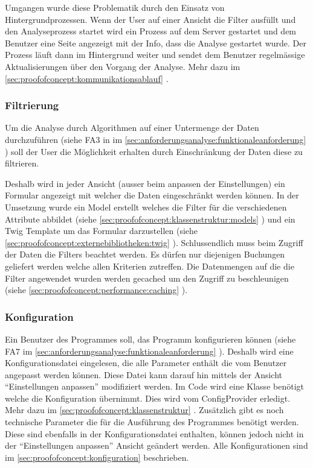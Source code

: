 Umgangen wurde diese Problematik durch den Einsatz von Hintergrundprozessen. Wenn der User auf einer Ansicht die Filter ausfüllt und den Analyseprozess startet wird ein Prozess auf dem Server gestartet und dem Benutzer eine Seite angezeigt mit der Info, dass die Analyse gestartet wurde. Der Prozess läuft dann im Hintergrund weiter und sendet dem Benutzer regelmässige Aktualisierungen über den Vorgang der Analyse. Mehr dazu im \cref{sec:proofofconcept:kommunikationsablauf} .

\subsubsection{Filtrierung}
\label{sec:proofofconcept:architektur:anforderungen:filtrierung}
Um die Analyse durch Algorithmen auf einer Untermenge der Daten durchzuführen (siehe FA3 in im \cref{sec:anforderungsanalyse:funktionaleanforderung} ) soll der User die Möglichkeit erhalten durch Einschränkung der Daten diese zu filtrieren. 

Deshalb wird in jeder Ansicht (ausser beim anpassen der Einstellungen) ein Formular angezeigt mit welcher die Daten eingeschränkt werden können. In der Umsetzung wurde ein Model erstellt welches die Filter für die verschiedenen Attribute abbildet (siehe \cref{sec:proofofconcept:klassenstruktur:models} ) und ein Twig Template um das Formular darzustellen (siehe \cref{sec:proofofconcept:externebibliotheken:twig} ). Schlussendlich muss beim Zugriff der Daten die Filters beachtet werden. Es dürfen nur diejenigen Buchungen geliefert werden welche allen Kriterien zutreffen. Die Datenmengen auf die die Filter angewendet wurden werden gecached um den Zugriff zu beschleunigen (siehe \cref{sec:proofofconcept:performance:caching} ).

\subsubsection{Konfiguration}
Ein Benutzer des Programmes soll, das Programm konfigurieren können (siehe FA7 im \cref{sec:anforderungsanalyse:funktionaleanforderung} ). Deshalb wird eine Konfigurationsdatei eingelesen, die alle Parameter enthält die vom Benutzer angepasst werden können. Diese Datei kann darauf hin mittels der Ansicht "`Einstellungen anpassen"' modifiziert werden. Im Code wird eine Klasse benötigt welche die Konfiguration übernimmt. Dies wird vom ConfigProvider erledigt. Mehr dazu im \cref{sec:proofofconcept:klassenstruktur} . Zusätzlich gibt es noch technische Parameter die für die Ausführung des Programmes benötigt werden. Diese sind ebenfalls in der Konfigurationsdatei enthalten, können jedoch nicht in der "`Einstellungen anpassen"' Ansicht geändert werden. Alle Konfigurationen sind im \cref{sec:proofofconcept:konfiguration}  beschrieben.



